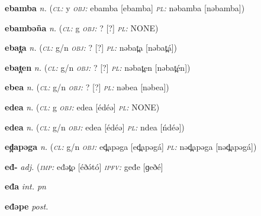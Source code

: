 \newentry
\headword\textbf{ebamba}  
\ipa{[ebamba]}
\synpos\textit{n.} 
\class(\textit{\textsc{cl:}} {y}
\object\textit{\textsc{obj:}} ebamba [ebamba]
\plural\textit{\textsc{pl:}} nəbamba [nəbamba])

\newentry
\headword\textbf{ebambəña}  
\ipa{[ebambəɲá]}
\synpos\textit{n.} 
\class(\textit{\textsc{cl:}} {g}
\object\textit{\textsc{obj:}} ? [?]
\plural\textit{\textsc{pl:}} NONE)  

\newentry
\headword\textbf{ebat̪a}  
\ipa{[ebat̪á]}
\synpos\textit{n.} 
\class(\textit{\textsc{cl:}} {g/n}
\object\textit{\textsc{obj:}} ? [?]
\plural\textit{\textsc{pl:}} nəbat̪a [nəbat̪á])

\newentry
\headword\textbf{ebat̪en}  
\ipa{[ebat̪én]}
\synpos\textit{n.} 
\class(\textit{\textsc{cl:}} {g/n}
\object\textit{\textsc{obj:}} ? [?]
\plural\textit{\textsc{pl:}} nəbat̪en [nəbat̪én])

\newentry
\headword\textbf{ebea}  
\ipa{[ebea]}
\synpos\textit{n.} 
\class(\textit{\textsc{cl:}} {g/n}
\object\textit{\textsc{obj:}} ? [?]
\plural\textit{\textsc{pl:}} nəbea [nəbea])


\newentry
\headword\textbf{edea}  
\ipa{[édéə]}
\synpos\textit{n.} 
\class(\textit{\textsc{cl:}} {g}
\object\textit{\textsc{obj:}} edea [édéə]
\plural\textit{\textsc{pl:}} NONE)

\newentry
\headword\textbf{edea}  
\ipa{[édéə]}
\synpos\textit{n.} 
\class(\textit{\textsc{cl:}} {g/n}
\object\textit{\textsc{obj:}} edea [édéə]
\plural\textit{\textsc{pl:}} ndea [ńdéə])

\newentry
\headword\textbf{ed̪apəga}  
\ipa{[ed̪apəgá]}
\synpos\textit{n.} 
\class(\textit{\textsc{cl:}} {g/n}
\object\textit{\textsc{obj:}} ed̪apəga [ed̪apəgá]
\plural\textit{\textsc{pl:}} nəd̪apəga [nəd̪apəgá])


\newentry
\headword\textbf{eđ-}  
\ipa{[eð-]}
\synpos\textit{adj.} 
\imperative(\textit {\textsc{imp:}} eđət̪o [éðə́tó]
\imperfective\textit {\textsc{ipfv:}} geđe [ɡeðé]


\newentry
\headword\textbf{eđa}  
\ipa{[eðá]}
\synpos\textit{int. pn} 

\newentry
\headword\textbf{eđəpe}  
\ipa{[eðəpe]}
\synpos\textit{post.} 

